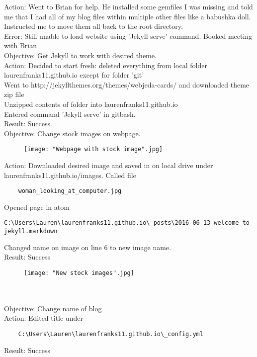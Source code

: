 \documentclass{article}
\begin{document}
Action: Went to Brian for help. He installed some gemfiles I was missing and told me that I had all of my blog files within multiple other files like a babushka doll. Instructed me to move them all back to the root directory.\\
Error: Still unable to load website using 'Jekyll serve' command. Booked meeting with Brian\\

Objective: Get Jekyll to work with desired theme.\\
Action: Decided to start fresh: deleted everything from local folder laurenfranks11.github.io except for folder 'git' \\ 
Went to http://jekyllthemes.org/themes/webjeda-cards/ and downloaded theme zip file \\
Unzipped contents of folder into laurenfranks11.github.io\\
Entered command 'Jekyll serve' in gitbash.\\
Result: Success.\\

Objective: Change stock images on webpage.
\begin{figure}[htp]
    \centering
    \texttt{[image: "Webpage with stock image".jpg]}
\end{figure}
\newline
Action: Downloaded desired image and saved in on local drive under laurenfranks11.github.io/images. Called file \begin{verbatim}
    woman_looking_at_computer.jpg
\end{verbatim}
Opened page in atom \begin{verbatim}
C:\Users\Lauren\laurenfranks11.github.io\_posts\2016-06-13-welcome-to-jekyll.markdown\end{verbatim}
Changed name on image on line 6 to new image name.\\
Result: Success
\begin{figure}[htp]
    \centering
    \texttt{[image: "New stock images".jpg]}
\end{figure}
\newline
\\
\\
Objective: Change name of blog\\
Action: Edited title under \begin{verbatim}
    C:\Users\Lauren\laurenfranks11.github.io\_config.yml\end{verbatim} 
Result: Success \\
\end{document}
